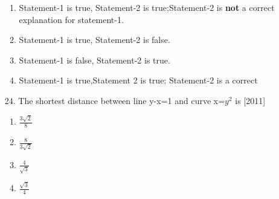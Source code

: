 \documentclass[journal,12pt,twocolumn]{IEEEtran}
\theoremstyle{remark}
\begin{document}
\begin{enumerate}
            \begin{enumerate}
                \item Statement-1 is true, Statement-2 is true;Statement-2 is \textbf{not} a correct explanation for statement-1.
        \item Statement-1 is true, Statement-2 is false.
        \item Statement-1 is false, Statement-2 is true.
        \item Statement-1 is true,Statement 2 is true; Statement-2 is a correct 
        
            \end{enumerate}
            
            \item[24.] The shortest distance between line y-x=1 and curve x=$y^2$ is \hfill[2011]
            \begin{enumerate}
    \item $\frac{3\sqrt{2}}{8}$
        \item $\frac{8}{3\sqrt{2}}$
        \item $\frac{4}{\sqrt{3}}$
        \item $\frac{\sqrt{3}}{4}$
            \end{enumerate}
            
    
        
        
    
    \end{enumerate}
\end{document}
